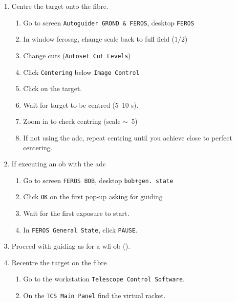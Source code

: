 \documentclass[11pt,fleqn,a4paper]{book}
\begin{document}
\begin{enumerate}
\begin{enumerate}
        \begin{itemize}
             \item On the panel, field \texttt{Filtre Name} will first display \texttt{Moving}.
            \item tre name appears, proceed \\
        \end{itemize}
    \end{enumerate}
    \item Centre the target onto the fibre.
    \begin{enumerate}
        \item Go to screen \texttt{Autoguider GROND \& FEROS}, \gls{desktop} \texttt{FEROS}
        \item In window \gls{ferosag}, change scale back to full field ($1/2$) 
        \item Change cuts (\texttt{Autoset Cut Levels})
        \item Click \texttt{Centering} below \texttt{Image Control}
        \item Click on the target.
        \item Wait for target to be centred (5--10 s).
        \item Zoom in to check centring (scale $\sim$~5)
        \item If not using the \gls{adc}, repeat centring until you achieve close to perfect centering.
    \end{enumerate}
    \item If executing an \gls{ob} with the \gls{adc}
    \begin{enumerate}
        \item Go to screen \texttt{FEROS BOB}, \gls{desktop} \texttt{bob+gen. state}
        \item Click \texttt{OK} on the first pop-up asking for guiding
        \item Wait for the first exposure to start.
        \item In \texttt{FEROS \gls{General State}}, click \texttt{PAUSE}. 
    \end{enumerate}
    \item\label{list:wfiguideforferos} Proceed with guiding as for a \gls{wfi} \gls{ob} ().
    \item Recentre the target on the fibre 
    \begin{enumerate}
         \item Go to the workstation \texttt{Telescope Control Software}.
         \item On the \texttt{TCS Main Panel} find the virtual racket.

\end{enumerate}
\end{enumerate}
\end{document}
